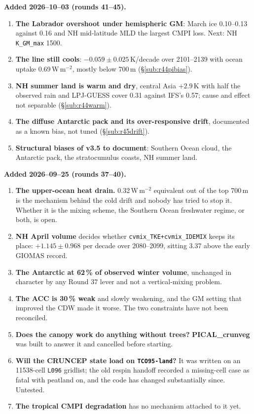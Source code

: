 \documentclass[10pt]{article}
\begin{document}
\textbf{Added 2026--10--03 (rounds 41--45).}
\begin{enumerate}\itemsep2pt
\item \textbf{The Labrador overshoot under hemispheric GM}: March ice 0.10--0.13 against 0.16 and
NH mid-latitude MLD the largest CMPI loss. Next: NH \texttt{K\_GM\_max} 1500.
\item \textbf{The line still cools}: $-0.059\pm0.025$\,K/decade over 2101--2139 with ocean uptake
0.69\,W\,m$^{-2}$, mostly below 700\,m (\S\ref{sub:r44pibias}).
\item \textbf{NH summer land is warm and dry}, central Asia $+2.9$\,K with half the observed rain and
LPJ-GUESS cover 0.31 against IFS's 0.57; cause and effect not separable (\S\ref{sub:r44warm}).
\item \textbf{The diffuse Antarctic pack and its over-responsive drift}, documented as a known bias,
not tuned (\S\ref{sub:r45drift}).
\item \textbf{Structural biases of v3.5 to document}: Southern Ocean cloud, the Antarctic pack, the
stratocumulus coasts, NH summer land.
\end{enumerate}

\textbf{Added 2026--09--25 (rounds 37--40).}
\begin{enumerate}\itemsep2pt
\item \textbf{The upper-ocean heat drain.} 0.32\,W\,m$^{-2}$ equivalent out of the top 700\,m is
the mechanism behind the cold drift and nobody has tried to stop it. Whether it is the mixing
scheme, the Southern Ocean freshwater regime, or both, is open.
\item \textbf{NH April volume} decides whether \texttt{cvmix\_TKE+cvmix\_IDEMIX} keeps its
place: $+1.145\pm0.968$ per decade over 2080--2099, sitting 3.37 above the early GIOMAS record.
\item \textbf{The Antarctic at 62\,\% of observed winter volume}, unchanged in character by any
Round 37 lever and not a vertical-mixing problem.
\item \textbf{The ACC is 30\,\% weak} and slowly weakening, and the GM setting that improved the
CDW made it worse. The two constraints have not been reconciled.
\item \textbf{Does the canopy work do anything without trees?} \textbf{PICAL\_crunveg} was built
to answer it and cancelled before starting.
\item \textbf{Will the CRUNCEP state load on \texttt{TCO95-land}?} It was written on an
11538-cell \texttt{L096} gridlist; the old respin handoff recorded a missing-cell case as fatal
with peatland on, and the code has changed substantially since. Untested.
\item \textbf{The tropical CMPI degradation} has no mechanism attached to it yet.
\end{enumerate}
\end{document}

